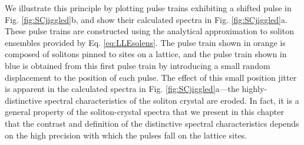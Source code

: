 We illustrate this principle by plotting pulse trains exhibiting a shifted pulse in Fig. \ref{fig:SCjiggled}b, and show their calculated spectra in Fig. \ref{fig:SCjiggled}a. These pulse trains are constructed using the analytical approximation to soliton ensembles provided by Eq. \ref{eq:LLEsolens}. The pulse train shown in orange is composed of solitons pinned to sites on a lattice, and the pulse train shown in blue is obtained from this first pulse train by introducing a small random displacement to the position of each pulse. The effect of this small position jitter is apparent in the calculated spectra in Fig. \ref{fig:SCjiggled}a---the highly-distinctive spectral characteristics of the soliton crystal are eroded. In fact, it is a general property of the soliton-crystal spectra that we present in this chapter that the contrast and definition of the distinctive spectral characteristics depends on the high precision with which the pulses fall on the lattice sites.



%
%

